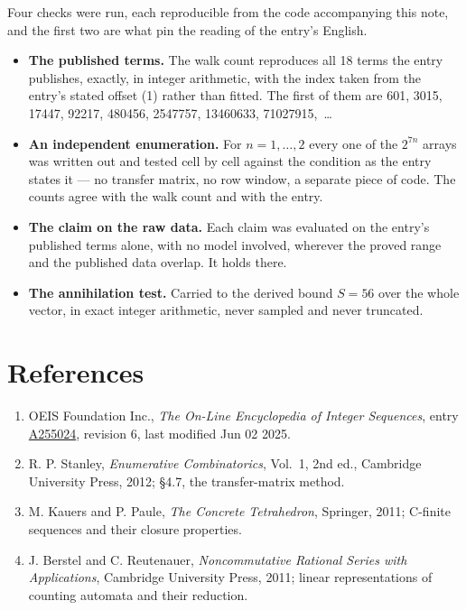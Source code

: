 \documentclass[11pt]{article}
\theoremstyle{definition}
\begin{document}
Four checks were run, each reproducible from the code accompanying this note, and the first two are what pin the reading of the entry's English.

\begin{itemize}

\item {\bfseries The published terms.} The walk count reproduces all 18 terms the entry publishes, exactly, in integer arithmetic, with the index taken from the entry's stated offset (1) rather than fitted. The first of them are 601, 3015, 17447, 92217, 480456, 2547757, 13460633, 71027915,~\dots

\item {\bfseries An independent enumeration.} For $n = 1,\dots,2$ every one of the $2^{7n}$ arrays was written out and tested cell by cell against the condition as the entry states it --- no transfer matrix, no row window, a separate piece of code. The counts agree with the walk count and with the entry.

\item {\bfseries The claim on the raw data.} Each claim was evaluated on the entry's published terms alone, with no model involved, wherever the proved range and the published data overlap. It holds there.

\item {\bfseries The annihilation test.} Carried to the derived bound $S = 56$ over the whole vector, in exact integer arithmetic, never sampled and never truncated.

\end{itemize}

\section{References}

\begin{enumerate}

\item OEIS Foundation Inc., \emph{The On-Line Encyclopedia of Integer Sequences}, entry \href{https://oeis.org/A255024}{A255024}, revision 6, last modified Jun 02 2025.

\item R. P. Stanley, \emph{Enumerative Combinatorics}, Vol.~1, 2nd ed., Cambridge University Press, 2012; \S4.7, the transfer-matrix method.

\item M. Kauers and P. Paule, \emph{The Concrete Tetrahedron}, Springer, 2011; C-finite sequences and their closure properties.

\item J. Berstel and C. Reutenauer, \emph{Noncommutative Rational Series with Applications}, Cambridge University Press, 2011; linear representations of counting automata and their reduction.

\end{enumerate}
\end{document}
